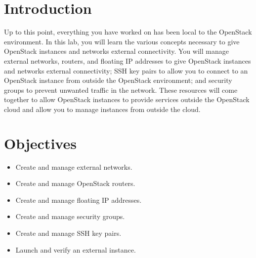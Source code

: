 \documentclass[letterpaper, 12pt]{article}
\begin{document}

\section*{Introduction}\label{sec:introduction}
Up to this point, everything you have worked on has been local to the OpenStack environment.
In this lab, you will learn the various concepts necessary to give OpenStack instances and networks external connectivity.
You will manage external networks, routers, and floating IP addresses to give OpenStack instances and networks external connectivity; SSH key pairs to allow you to connect to an OpenStack instance from outside the OpenStack environment; and security groups to prevent unwanted traffic in the network.
These resources will come together to allow OpenStack instances to provide services outside the OpenStack cloud and allow you to manage instances from outside the cloud.

\section*{Objectives}\label{sec:objectives}
\begin{itemize}[itemsep=0pt]
    \item Create and manage external networks.
    \item Create and manage OpenStack routers.
    \item Create and manage floating IP addresses.
    \item Create and manage security groups.
    \item Create and manage SSH key pairs.
    \item Launch and verify an external instance.
\end{itemize}
\clearpage

\labsettings

\end{document}
